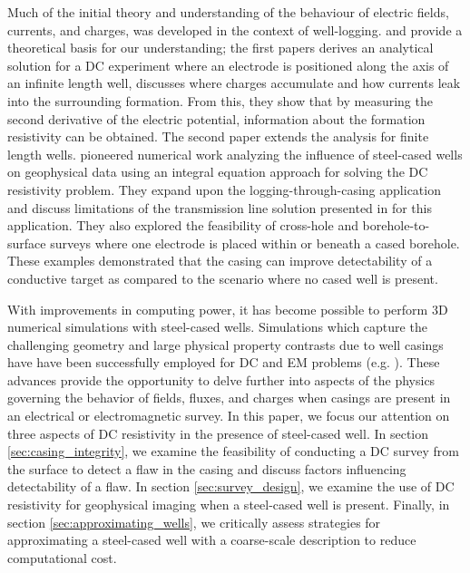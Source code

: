Much of the initial theory and understanding of the behaviour of electric fields, currents, and charges, was developed in the context of well-logging. \cite{Kaufman1990} and \cite{Kaufman1993} provide a theoretical basis for our understanding; the first papers derives an analytical solution for a DC experiment where an electrode is positioned along the axis of an infinite length well, discusses where charges accumulate and how currents leak into the surrounding formation. From this, they show that by measuring the second derivative of the electric potential, information about the formation resistivity can be obtained. The second paper extends the analysis for finite length wells. \cite{Schenkel1990, Schenkel1991, Schenkel1994} pioneered numerical work analyzing the influence of steel-cased wells on geophysical data using an integral equation approach for solving the DC resistivity problem. They expand upon the logging-through-casing application and discuss limitations of the transmission line solution presented in \cite{Kaufman1990} for this application. They also explored the feasibility of cross-hole and borehole-to-surface surveys where one electrode is placed within or beneath a cased borehole. These examples demonstrated that the casing can improve detectability of a conductive target as compared to the scenario where no cased well is present.

With improvements in computing power, it has become possible to perform 3D numerical simulations with steel-cased wells. Simulations which capture the challenging geometry and large physical property contrasts due to well casings have have been successfully employed for DC and EM problems (e.g. \cite{Swidinsky2013, Commer2015, Hoversten2015, Tang2015, Um2015, Weiss2016, Yang2016, Heagy2018}). These advances provide the opportunity to delve further into aspects of the physics governing the behavior of fields, fluxes, and charges when casings are present in an electrical or electromagnetic survey. In this paper, we focus our attention on three aspects of DC resistivity in the presence of steel-cased well. In section \ref{sec:casing_integrity}, we examine the feasibility of conducting a DC survey from the surface to detect a flaw in the casing and discuss factors influencing detectability of a flaw. In section \ref{sec:survey_design}, we examine the use of DC resistivity for geophysical imaging when a steel-cased well is present. Finally, in section \ref{sec:approximating_wells}, we critically assess strategies for approximating a steel-cased well with a coarse-scale description to reduce computational cost.

